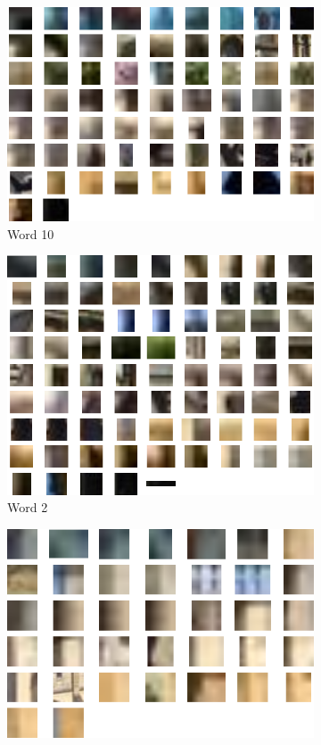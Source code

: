 \documentclass[a4paper,10pt]{article}
\begin{document}
\begin{figure}
\begin{subfigure}{0.49\textwidth}
    \centering
    \includegraphics[width=\textwidth,height=.3\textheight,keepaspectratio]{word3}
    \caption{Word 10}
  \end{subfigure}
  \begin{subfigure}{0.49\textwidth}
    \centering
    \includegraphics[width=\textwidth,height=.3\textheight,keepaspectratio]{word4}
    \caption{Word 2}
  \end{subfigure}
  \begin{subfigure}{0.49\textwidth}
    \centering
    \includegraphics[width=\textwidth,height=.3\textheight,keepaspectratio]{word5}

\end{subfigure}
\end{figure}
\end{document}

